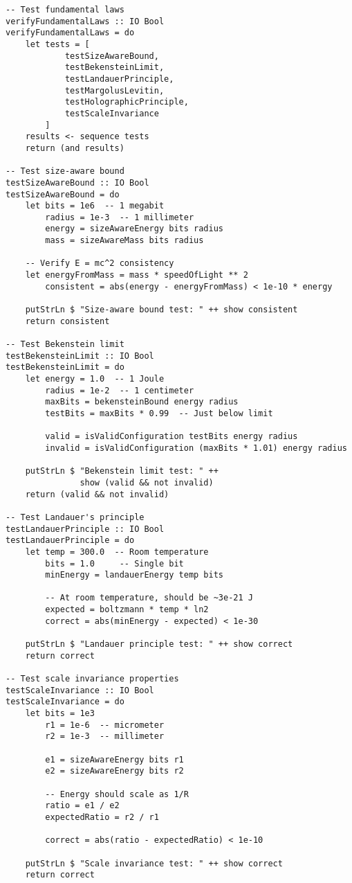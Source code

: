 \documentclass[11pt,a4paper]{article}
\theoremstyle{definition}
\begin{document}
\begin{lstlisting}
-- Test fundamental laws
verifyFundamentalLaws :: IO Bool
verifyFundamentalLaws = do
    let tests = [
            testSizeAwareBound,
            testBekensteinLimit,
            testLandauerPrinciple,
            testMargolusLevitin,
            testHolographicPrinciple,
            testScaleInvariance
        ]
    results <- sequence tests
    return (and results)

-- Test size-aware bound
testSizeAwareBound :: IO Bool
testSizeAwareBound = do
    let bits = 1e6  -- 1 megabit
        radius = 1e-3  -- 1 millimeter
        energy = sizeAwareEnergy bits radius
        mass = sizeAwareMass bits radius
        
    -- Verify E = mc^2 consistency
    let energyFromMass = mass * speedOfLight ** 2
        consistent = abs(energy - energyFromMass) < 1e-10 * energy
    
    putStrLn $ "Size-aware bound test: " ++ show consistent
    return consistent

-- Test Bekenstein limit
testBekensteinLimit :: IO Bool
testBekensteinLimit = do
    let energy = 1.0  -- 1 Joule
        radius = 1e-2  -- 1 centimeter
        maxBits = bekensteinBound energy radius
        testBits = maxBits * 0.99  -- Just below limit
        
        valid = isValidConfiguration testBits energy radius
        invalid = isValidConfiguration (maxBits * 1.01) energy radius
    
    putStrLn $ "Bekenstein limit test: " ++ 
               show (valid && not invalid)
    return (valid && not invalid)

-- Test Landauer's principle
testLandauerPrinciple :: IO Bool
testLandauerPrinciple = do
    let temp = 300.0  -- Room temperature
        bits = 1.0     -- Single bit
        minEnergy = landauerEnergy temp bits
        
        -- At room temperature, should be ~3e-21 J
        expected = boltzmann * temp * ln2
        correct = abs(minEnergy - expected) < 1e-30
    
    putStrLn $ "Landauer principle test: " ++ show correct
    return correct

-- Test scale invariance properties
testScaleInvariance :: IO Bool
testScaleInvariance = do
    let bits = 1e3
        r1 = 1e-6  -- micrometer
        r2 = 1e-3  -- millimeter
        
        e1 = sizeAwareEnergy bits r1
        e2 = sizeAwareEnergy bits r2
        
        -- Energy should scale as 1/R
        ratio = e1 / e2
        expectedRatio = r2 / r1
        
        correct = abs(ratio - expectedRatio) < 1e-10
    
    putStrLn $ "Scale invariance test: " ++ show correct
    return correct
\end{lstlisting}
\end{document}
